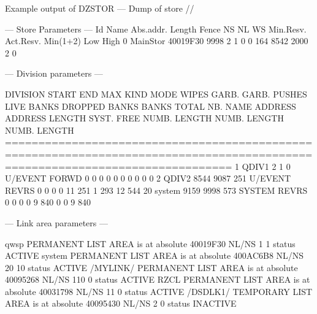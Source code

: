 \begin{Listing}{Example output of }
DZSTOR --- Dump of store //                                                                                                      
                                                                                                                                 
 --- Store Parameters ---                                                                                                        
Id    Name    Abs.addr.  Length   Fence      NS      NL      WS  Min.Resv.  Act.Resv.   Min(1+2)   Low  High                     
 0  MainStor  40019F30     9998       2       1       0       0        164       8542       2000     2     0                     
                                                                                                                                 
 --- Division parameters ---                                                                                                     
                                                                                                                                 
   DIVISION    START    END       MAX    KIND   MODE  WIPES  GARB.  GARB. PUSHES      LIVE BANKS  DROPPED BANKS    BANKS TOTAL   
 NB.   NAME   ADDRESS ADDRESS  LENGTH                        SYST.   FREE         NUMB.   LENGTH NUMB.   LENGTH NUMB.   LENGTH   
==============================================================================================================================   
  1  QDIV1          2       1       0 U/EVENT  FORWD      0      0      0      0       0        0     0        0     0        0  
  2  QDIV2       8544    9087     251 U/EVENT  REVRS      0      0      0      0      11      251     1      293    12      544  
 20  system      9159    9998     573  SYSTEM  REVRS      0      0      0      0       9      840     0        0     9      840  
                                                                                                                                 
 --- Link area parameters ---                                                                                                    
                                                                                                                                 
qwsp     PERMANENT LIST AREA      is at absolute 40019F30 NL/NS     1    1     status   ACTIVE                                   
system   PERMANENT LIST AREA      is at absolute 400AC6B8 NL/NS    20   10     status   ACTIVE                                   
/MYLINK/ PERMANENT LIST AREA      is at absolute 40095268 NL/NS   110    0     status   ACTIVE                                   
RZCL     PERMANENT LIST AREA      is at absolute 40031798 NL/NS    11    0     status   ACTIVE                                   
/DSDLK1/ TEMPORARY LIST AREA      is at absolute 40095430 NL/NS     2    0     status INACTIVE                                   
\end{Listing}

